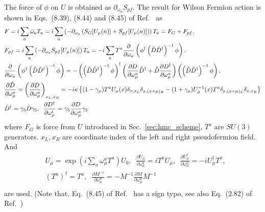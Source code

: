 The force of $\phi$ on $U$ is obtained as $\partial _{\omega_a}S_{pf}$. The result for Wilson Fermion action is shown in Eqs.~(8.39), (8.44) and (8.45) of Ref.~\cite{latticeqcdbook2010} as
\begin{equation}
\begin{split}
&F=i\sum _a\dot{\omega}_aT_a=i\sum _a\left(-\partial _{\omega _a}\left(S_G[U_{\mu}(n)]+S_{pf}[U_{\mu}(n)]\right)\right)T_a=F_G+F_{pf}.\\
&F_{pf}=i\sum _a\left(-\partial _{\omega _a}S_{pf}[U_{\mu}(n)]\right)T_a=-i\sum_aT^a \frac{\partial}{\partial \omega_a} \left(\phi ^{\dagger}\left(\hat{D}\hat{D}^{\dagger}\right)^{-1}\phi\right).\\
&\frac{\partial}{\partial \omega_a} \left(\phi ^{\dagger}\left(\hat{D}\hat{D}^{\dagger}\right)^{-1}\phi\right) = -\left(\left(\hat{D}\hat{D}^{\dagger}\right)^{-1}\phi\right)^{\dagger}\left(\frac{\partial D}{\partial \omega _{\mu}^a}\hat{D}^{\dagger}+\hat{D}\frac{\partial D^{\dagger}}{\partial \omega _{\mu}^a}\right)\left(\left(\hat{D}\hat{D}^{\dagger}\right)^{-1}\phi\right).\\
&\frac{\partial \hat{D}}{\partial {\omega _{\mu}^a}}=\left(\frac{\partial D}{\partial {\omega _{\mu}^a}}\right)_{x_L.x_R}=-i\kappa \left\{(1-\gamma _{\mu})T^aU_{\mu}(x)\delta_{x,x_L}\delta _{x,(x+\mu)_R}-(1+\gamma _{\mu})U_{\mu}^{-1}(x)T^a\delta _{x,(x\textcolor[rgb]{1,0,0}{+}\mu)_L}\delta _{x,x_R} \right\} \\
&\hat{D}^{\dagger} = \gamma _5 \hat{D} \gamma _5, \;\;\frac{\partial D^{\dagger}}{\partial \omega _{\mu}^i}=\gamma _5 \frac{\partial D}{\partial \omega _{\mu}^a} \gamma _5\\
\end{split}
\end{equation}
where $F_G$ is force from $U$ introduced in Sec.~\ref{sec:hmc_scheme}, $T^a$ are $SU(3)$ generators. $x_L,x_R$ are coordinate index of the left and right pseudofermion field. And
\begin{equation}
\begin{split}
&U_{\mu}=\exp (i\sum _a \omega _{\mu}^a T^a)U_0,\;\;\frac{\partial U_{\mu}}{\partial \omega_{\mu}^a}=iT^aU_{\mu},\;\;\frac{\partial U^{\dagger}_{\mu}}{\partial \omega_{\mu}^a}=-iU^{\dagger}_{\mu}T^a,\\
&\left(T^a\right)^{\dagger}=T^a,\;\;\frac{\partial M^{-1}}{\partial \omega _{\mu}^a}=-M^{-1}\frac{\partial M}{\partial \omega _{\mu}^a}M^{-1}\\
\end{split}
\end{equation}
are used. (Note that, Eq.~(8.45) of Ref.~\cite{latticeqcdbook2010} has a sign typo, see also Eq.~(2.82) of Ref.~\cite{latticeqcdreview2009})

